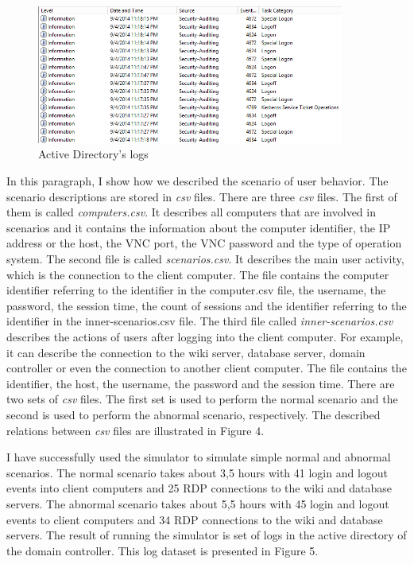 \begin{figure}[ht!]
\centering
\includegraphics[width=0.9\textwidth]{active_directory_logs_result_2.png}
\caption{Active Directory's logs}
\label{overflow}
\end{figure}



In this paragraph, I show how we described the scenario of user behavior. The scenario descriptions are stored in \textit{csv} files. There are three \textit{csv} files. The first of them is called \textit{computers.csv}. It describes all computers that are involved in scenarios and it contains the information about the computer identifier, the IP address or the host, the VNC port, the VNC password and the type of operation system.
The second file is called \textit{scenarios.csv}. It describes the main user activity, which is the connection to the client computer. The file contains the computer identifier referring to the identifier in the computer.csv file, the username, the password, the session time, the count of sessions and the identifier referring to the identifier in the inner-scenarios.csv file. The third file called \textit{inner-scenarios.csv} describes the actions of users after logging into the client computer. For example, it can describe the connection to the wiki server, database server, domain controller or even the connection to another client computer. The file contains the identifier, the host, the username, the password and the session time. There are two sets of \textit{csv} files. The first set is used to perform the normal scenario and the second is used to perform the abnormal scenario, respectively. The described relations between \textit{csv} files are illustrated in Figure 4.
 	
 	
I have successfully used the simulator to simulate simple normal and abnormal scenarios. The normal scenario takes about 3,5 hours with 41 login and logout events into client computers and 25 RDP connections to the wiki and database servers. The abnormal scenario takes about 5,5 hours with 45 login and logout events to client computers and 34 RDP connections to the wiki and database servers. The result of running the simulator is set of logs in the active directory of the domain controller. This log dataset is presented in Figure 5. 


 
% 